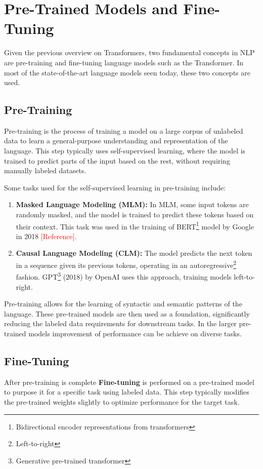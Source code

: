 \documentclass[11pt,twoside]{article}
\begin{document}
\section{Pre-Trained Models and Fine-Tuning}
Given the previous overview on Transformers, two fundamental concepts in NLP are pre-training and fine-tuning language models such as the Transformer. In most of the state-of-the-art language models seen today, these two concepts are used.

\subsection{Pre-Training}
Pre-training is the process of training a model on a large corpus of unlabeled data to learn a general-purpose understanding and representation of the language. This step typically uses self-supervised learning, where the model is trained to predict parts of the input based on the rest, without requiring manually labeled datasets.

Some tasks used for the self-supervised learning in pre-training include:

\begin{enumerate}
    \item \textbf{Masked Language Modeling (MLM):} In MLM, some input tokens are randomly masked, and the model is trained to predict these tokens based on their context. This task was used in the training of BERT\footnote{Bidirectional encoder representations from transformers}  model by Google in 2018 \textcolor{red}{[Reference]}.

    \item \textbf{Causal Language Modeling (CLM):} The model predicts the next token in a sequence given its previous tokens, operating in an autoregressive\footnote{Left-to-right} fashion. GPT\footnote{Generative pre-trained transformer} (2018) by OpenAI uses this approach, training models left-to-right.
\end{enumerate}

Pre-training allows for the learning of syntactic and semantic patterns of the language. These pre-trained models are then used as a foundation, significantly reducing the labeled data requirements for downstream tasks. In the larger pre-trained models improvement of performance can be achieve on diverse tasks.

\subsection{Fine-Tuning}
After pre-training is complete \textbf{Fine-tuning} is performed on a pre-trained model to purpose it for a specific task using labeled data. This step typically modifies the pre-trained weights slightly to optimize performance for the target task.
\end{document}
